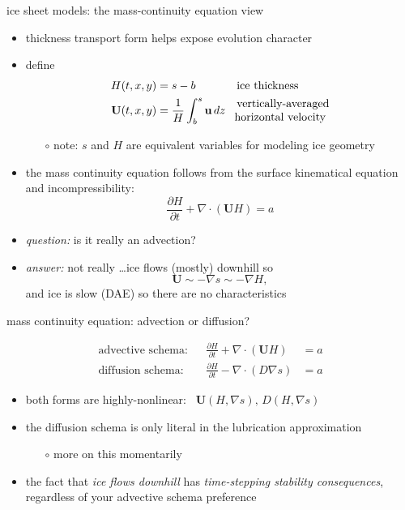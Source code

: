 \documentclass[svgnames,
               hyperref={colorlinks,citecolor=DeepPink4,linkcolor=FireBrick,urlcolor=Maroon},
               usepdftitle=false]  %
               {beamer}
\newcommand{\grad}{\nabla}
\newcommand{\bu}{\mathbf{u}}
\newcommand{\bU}{\mathbf{U}}
\begin{document}
\begin{frame}{ice sheet models: the mass-continuity equation view}

\begin{itemize}
\item thickness transport form helps expose evolution character
\item define
\begin{align*}
H(t,x,y) &=s-b && \text{ice thickness} \\
\bU(t,x,y) &= \frac{1}{H} \int_b^s \bu \,dz && \begin{matrix} \text{vertically-averaged} \\ \hspace{-1.8mm} \text{horizontal velocity} \end{matrix}
\end{align*}

    \begin{itemize}
    \item[$\circ$] note: $s$ and $H$ are equivalent variables for modeling ice geometry
    \end{itemize}
\item<2-> the \alert{mass continuity equation} follows from the surface kinematical equation and incompressibility:
   $$\frac{\partial H}{\partial t} + \nabla \cdot \left(\bU H\right) = a$$

\smallskip
\item<3-> \emph{question:} is it really an advection?
\item<3->[] \emph{answer:} not really \dots ice flows (mostly) downhill so
  $$\bU \sim - \grad s \sim - \grad H,$$
and ice is slow (DAE) so there are no characteristics
\end{itemize}
\end{frame}


\begin{frame}{mass continuity equation: advection or diffusion?}

\begin{align*}
\text{advective schema:} && \frac{\partial H}{\partial t} + \nabla \cdot \left(\bU H\right) &= a \\
\text{diffusion schema:} && \frac{\partial H}{\partial t} - \nabla \cdot \left(D \grad s\right) &= a
\end{align*}
\begin{itemize}
\item both forms are highly-nonlinear: \, $\bU(H,\grad s), \, D(H,\grad s)$
\item the diffusion schema is only literal in the lubrication approximation
    \begin{itemize}
    \item[$\circ$] more on this momentarily
    \end{itemize}
\item the fact that \emph{ice flows downhill} has \emph{time-stepping stability consequences}, regardless of your advective schema preference
\end{itemize}
\end{frame}
\end{document}
